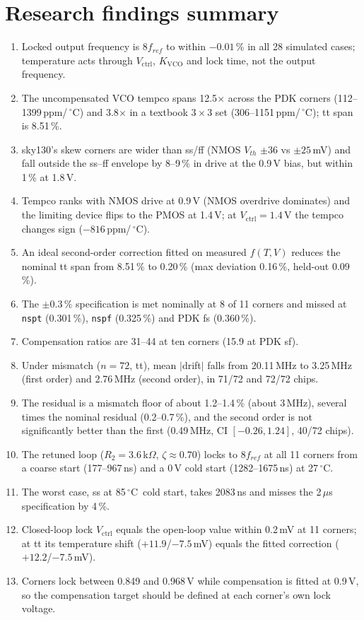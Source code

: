 \documentclass[11pt,a4paper]{article}
\newcommand{\kvco}{K_{\mathrm{VCO}}}
\newcommand{\vc}{V_{\mathrm{ctrl}}}
\newcommand{\degC}{\,$^\circ$C}
\begin{document}
\section{Research findings summary}
\begin{enumerate}
\item Locked output frequency is $8f_{ref}$ to within $-0.01$\,\% in all 28 simulated cases; temperature acts through $\vc$, $\kvco$ and lock time, not the output frequency.
\item The uncompensated VCO tempco spans 12.5$\times$ across the PDK corners (112--1399\,ppm/\degC) and 3.8$\times$ in a textbook $3\times3$ set (306--1151\,ppm/\degC); tt span is 8.51\,\%.
\item sky130's skew corners are wider than ss/ff (NMOS $V_{th}$ $\pm36$ vs $\pm25$\,mV) and fall outside the ss--ff envelope by 8--9\,\% in drive at the 0.9\,V bias, but within 1\,\% at 1.8\,V.
\item Tempco ranks with NMOS drive at 0.9\,V (NMOS overdrive dominates) and the limiting device flips to the PMOS at 1.4\,V; at $\vc=1.4$\,V the tempco changes sign ($-816$\,ppm/\degC).
\item An ideal second-order correction fitted on measured $f(T,V)$ reduces the nominal tt span from 8.51\,\% to 0.20\,\% (max deviation 0.16\,\%, held-out 0.09\,\%).
\item The $\pm0.3\,\%$ specification is met nominally at 8 of 11 corners and missed at \texttt{nspt} (0.301\,\%), \texttt{nspf} (0.325\,\%) and PDK fs (0.360\,\%).
\item Compensation ratios are 31--44 at ten corners (15.9 at PDK sf).
\item Under mismatch ($n=72$, tt), mean $|$drift$|$ falls from 20.11\,MHz to 3.25\,MHz (first order) and 2.76\,MHz (second order), in 71/72 and 72/72 chips.
\item The residual is a mismatch floor of about 1.2--1.4\,\% (about 3\,MHz), several times the nominal residual (0.2--0.7\,\%), and the second order is not significantly better than the first (0.49\,MHz, CI $[-0.26,1.24]$, 40/72 chips).
\item The retuned loop ($R_2=3.6$\,k$\Omega$, $\zeta\approx0.70$) locks to $8f_{ref}$ at all 11 corners from a coarse start (177--967\,ns) and a 0\,V cold start (1282--1675\,ns) at 27\degC.
\item The worst case, ss at 85\degC\ cold start, takes 2083\,ns and misses the 2\,$\mu$s specification by 4\,\%.
\item Closed-loop lock $\vc$ equals the open-loop value within 0.2\,mV at 11 corners; at tt its temperature shift ($+11.9$/$-7.5$\,mV) equals the fitted correction ($+12.2$/$-7.5$\,mV).
\item Corners lock between 0.849 and 0.968\,V while compensation is fitted at 0.9\,V, so the compensation target should be defined at each corner's own lock voltage.
\end{enumerate}
\end{document}

